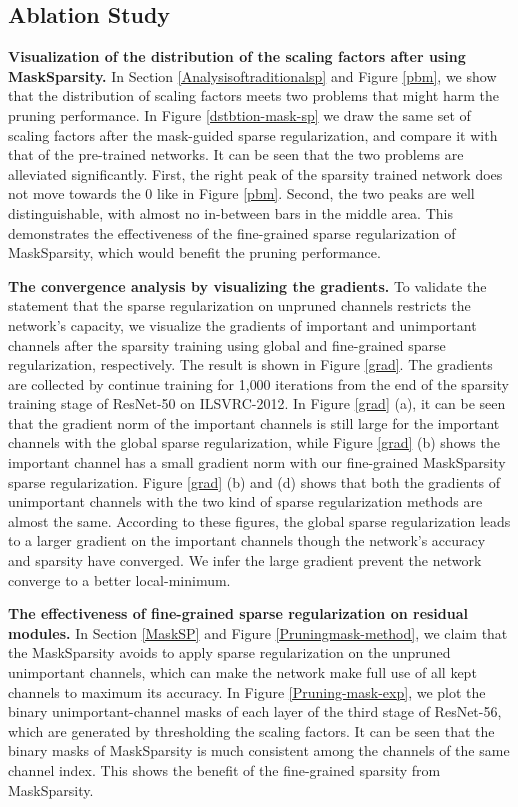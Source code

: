 \documentclass[review]{cvpr}
\begin{document}
\subsection{Ablation Study}\label{abalation}
\textbf{Visualization of the distribution of the scaling factors after using MaskSparsity.} 
In Section \ref{Analysisoftraditionalsp} and Figure \ref{pbm}, we show that the distribution of scaling factors meets two problems that might harm the pruning performance. In Figure \ref{dstbtion-mask-sp} we draw the same set of scaling factors after the mask-guided sparse regularization, and compare it with that of the pre-trained networks. It can be seen that the two problems are alleviated significantly. First, the right peak of the sparsity trained network does not move towards the 0 like in Figure \ref{pbm}. Second, the two peaks are well distinguishable, with almost no in-between bars in the middle area. This demonstrates the effectiveness of the fine-grained sparse regularization of MaskSparsity, which would benefit the pruning performance.
  

\textbf{The convergence analysis by visualizing the gradients.} To validate the statement that the sparse regularization on unpruned channels restricts the network's capacity, we visualize the gradients of important and unimportant channels after the sparsity training using global and fine-grained sparse regularization, respectively. The result is shown in Figure \ref{grad}. The gradients are collected by continue training for 1,000 iterations from the end of the sparsity training stage of ResNet-50 on ILSVRC-2012. In Figure \ref{grad} (a), it can be seen that the gradient norm of the important channels is still large for the important channels with the global sparse regularization, while Figure \ref{grad} (b) shows the important channel has a small gradient norm with our fine-grained MaskSparsity sparse regularization. Figure \ref{grad} (b) and (d) shows that both the gradients of unimportant channels with the two kind of sparse regularization methods are almost the same. According to these figures, the global sparse regularization leads to a larger gradient on the important channels though the network's accuracy and sparsity have converged. We infer the large gradient prevent the network converge to a better local-minimum.

\textbf{The effectiveness of fine-grained sparse regularization on residual modules.} In Section \ref{MaskSP} and Figure \ref{Pruningmask-method}, we claim that the MaskSparsity avoids to apply sparse regularization on the unpruned unimportant channels, which can make the network make full use of all kept channels to maximum its accuracy. In Figure \ref{Pruning-mask-exp}, we plot the binary unimportant-channel masks of each layer of the third stage of ResNet-56, which are generated by thresholding the scaling factors. It can be seen that the binary masks of MaskSparsity is much consistent among the channels of the same channel index. This shows the benefit of the fine-grained sparsity from MaskSparsity.
\end{document}
